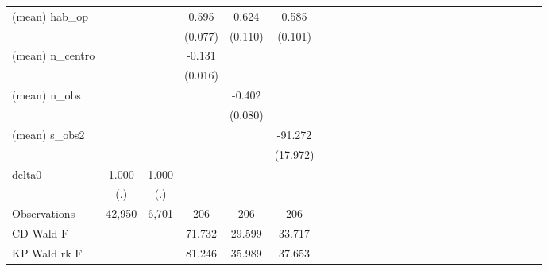 \begin{table}[htbp]
\begin{tabular}{l*{5}{c|cccc}}
(mean) hab\_op       &                     &                     &       0.595\sym{***}&       0.624\sym{***}&       0.585\sym{***}\\
                    &                     &                     &     (0.077)         &     (0.110)         &     (0.101)         \\
(mean) n\_centro     &                     &                     &      -0.131\sym{***}&                     &                     \\
                    &                     &                     &     (0.016)         &                     &                     \\
(mean) n\_obs        &                     &                     &                     &      -0.402\sym{***}&                     \\
                    &                     &                     &                     &     (0.080)         &                     \\
(mean) s\_obs2       &                     &                     &                     &                     &     -91.272\sym{***}\\
                    &                     &                     &                     &                     &    (17.972)         \\
delta0              &       1.000         &       1.000         &                     &                     &                     \\
                    &         (.)         &         (.)         &                     &                     &                     \\
\midrule
Observations        &      42,950         &       6,701         &         206         &         206         &         206         \\
CD Wald F           &                     &                     &      71.732         &      29.599         &      33.717         \\
KP Wald rk F        &                     &                     &      81.246         &      35.989         &      37.653         \\
\bottomrule
\end{tabular}
\end{table}
